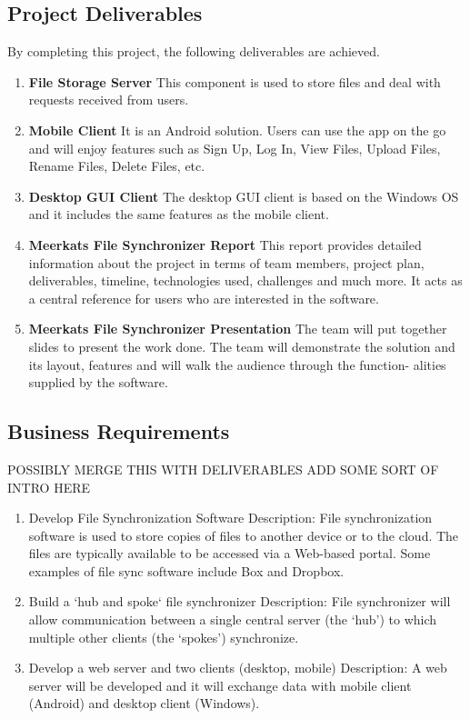 \documentclass{article}
\begin{document}
\subsection{Project Deliverables}
By completing this project, the following deliverables are achieved.
\begin{enumerate}
  \item \textbf{File Storage Server} This component is used to store files and deal with requests received from users.
  \item \textbf{Mobile Client} It is an Android solution. Users can use the app on the go and will enjoy features such as Sign Up, Log In, View Files, Upload Files, Rename Files, Delete Files, etc.
  \item \textbf{Desktop GUI Client} The desktop GUI client is based on the Windows OS and it includes the same features as the mobile client.
  \item \textbf{Meerkats File Synchronizer Report} This report provides detailed information about the project in terms of team members, project plan, deliverables, timeline, technologies used, challenges and much more. It acts as a central reference for users who are interested in the software.
  \item \textbf{Meerkats File Synchronizer Presentation} The team will put together slides to present the work done. The team will demonstrate the solution and its layout, features and will walk the audience through the function- alities supplied by the software.
\end{enumerate}


\subsection{Business Requirements}
POSSIBLY MERGE THIS WITH DELIVERABLES
ADD SOME SORT OF INTRO HERE
\begin{enumerate}
  \item Develop File Synchronization Software
  Description:  File synchronization software is used to store copies of files to another device or to the cloud. The files are typically available to be accessed via a Web-based portal. Some examples of file sync software include Box and Dropbox.
  \item Build a ‘hub and spoke‘ file synchronizer
  Description: File synchronizer will allow communication between a single central server (the ‘hub’) to which multiple other clients (the ‘spokes’) synchronize.
  \item Develop a web server and two clients (desktop, mobile)
  Description: A web server will be developed and it will exchange data with mobile client (Android) and desktop client (Windows).
\end{enumerate}
\end{document}
